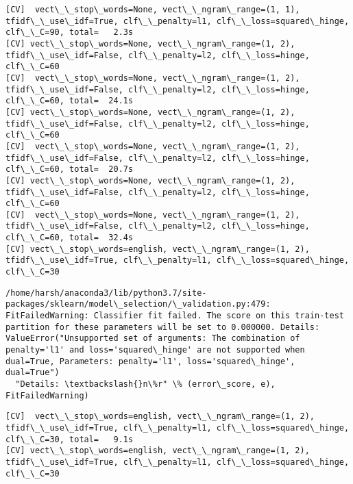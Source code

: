 \documentclass[11pt]{article}
\begin{document}
    \begin{Verbatim}[commandchars=\\\{\}]
[CV]  vect\_\_stop\_words=None, vect\_\_ngram\_range=(1, 1), tfidf\_\_use\_idf=True, clf\_\_penalty=l1, clf\_\_loss=squared\_hinge, clf\_\_C=90, total=   2.3s
[CV] vect\_\_stop\_words=None, vect\_\_ngram\_range=(1, 2), tfidf\_\_use\_idf=False, clf\_\_penalty=l2, clf\_\_loss=hinge, clf\_\_C=60 
[CV]  vect\_\_stop\_words=None, vect\_\_ngram\_range=(1, 2), tfidf\_\_use\_idf=False, clf\_\_penalty=l2, clf\_\_loss=hinge, clf\_\_C=60, total=  24.1s
[CV] vect\_\_stop\_words=None, vect\_\_ngram\_range=(1, 2), tfidf\_\_use\_idf=False, clf\_\_penalty=l2, clf\_\_loss=hinge, clf\_\_C=60 
[CV]  vect\_\_stop\_words=None, vect\_\_ngram\_range=(1, 2), tfidf\_\_use\_idf=False, clf\_\_penalty=l2, clf\_\_loss=hinge, clf\_\_C=60, total=  20.7s
[CV] vect\_\_stop\_words=None, vect\_\_ngram\_range=(1, 2), tfidf\_\_use\_idf=False, clf\_\_penalty=l2, clf\_\_loss=hinge, clf\_\_C=60 
[CV]  vect\_\_stop\_words=None, vect\_\_ngram\_range=(1, 2), tfidf\_\_use\_idf=False, clf\_\_penalty=l2, clf\_\_loss=hinge, clf\_\_C=60, total=  32.4s
[CV] vect\_\_stop\_words=english, vect\_\_ngram\_range=(1, 2), tfidf\_\_use\_idf=True, clf\_\_penalty=l1, clf\_\_loss=squared\_hinge, clf\_\_C=30 

    \end{Verbatim}

    \begin{Verbatim}[commandchars=\\\{\}]
/home/harsh/anaconda3/lib/python3.7/site-packages/sklearn/model\_selection/\_validation.py:479: FitFailedWarning: Classifier fit failed. The score on this train-test partition for these parameters will be set to 0.000000. Details: 
ValueError("Unsupported set of arguments: The combination of penalty='l1' and loss='squared\_hinge' are not supported when dual=True, Parameters: penalty='l1', loss='squared\_hinge', dual=True")
  "Details: \textbackslash{}n\%r" \% (error\_score, e), FitFailedWarning)

    \end{Verbatim}

    \begin{Verbatim}[commandchars=\\\{\}]
[CV]  vect\_\_stop\_words=english, vect\_\_ngram\_range=(1, 2), tfidf\_\_use\_idf=True, clf\_\_penalty=l1, clf\_\_loss=squared\_hinge, clf\_\_C=30, total=   9.1s
[CV] vect\_\_stop\_words=english, vect\_\_ngram\_range=(1, 2), tfidf\_\_use\_idf=True, clf\_\_penalty=l1, clf\_\_loss=squared\_hinge, clf\_\_C=30 

    \end{Verbatim}
\end{document}
